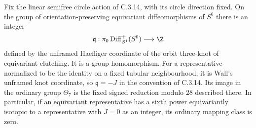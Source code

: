 \begin{proposition}
Fix the linear semifree circle action of C.3.14, with its
circle direction fixed. On the group of orientation-preserving
equivariant diffeomorphisms of $S^6$ there is an integer
\[
 \mathfrak q:\pi_0\operatorname{Diff}^+_{S^1}(S^6)
                    \longrightarrow\Z
\]
defined by the unframed Haefliger coordinate of the orbit
three-knot of equivariant clutching. It is a group homomorphism.
For a representative normalized to be the identity on a fixed
tubular neighbourhood, it is Wall's unframed knot coordinate,
so $\mathfrak q=-J$ in the convention of C.3.14. Its image in
the ordinary group $\Theta_7$ is the fixed signed reduction
modulo $28$ described there. In particular, if an equivariant
representative has a sixth power equivariantly isotopic to a
representative with $J=0$ as an integer, its ordinary mapping
class is zero.
\end{proposition}
